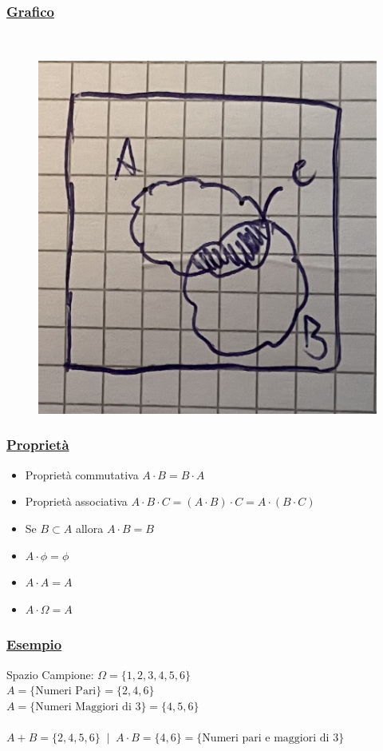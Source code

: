 \documentclass{article}
\begin{document}
\subsubsection{\underline{Grafico}} ~\\
\begin{figure}[ht]
\centering
\includegraphics[scale=0.13]{images/17.VennProdott.jpeg}
\end{figure} 
\subsubsection{\underline{Proprietà}}
\begin{itemize}
    \item Proprietà commutativa $A \cdot B = B \cdot A$
    \item Proprietà associativa $A \cdot B \cdot C = (A \cdot B) \cdot C = A \cdot (B \cdot C)$
    \item Se $B \subset A$ allora $A \cdot B = B$
    \item $A \cdot \phi = \phi$
    \item $A \cdot A = A$
    \item $A \cdot \Omega = A$
\end{itemize}
\subsubsection{\underline{Esempio}}
Spazio Campione: $\Omega=\{ 1,2,3,4,5,6\} $ \\
$A = \{ \text{Numeri Pari} \} = \{ 2,4,6\}$ \\
$A = \{ \text{Numeri Maggiori di } 3 \} = \{ 4,5,6 \}$ \\ \\
$A + B = \{ 2,4,5,6\} \;\; | \;\; A \cdot B = \{ 4,6 \} = \{ \text{Numeri pari e maggiori di } 3\}$
\end{document}

